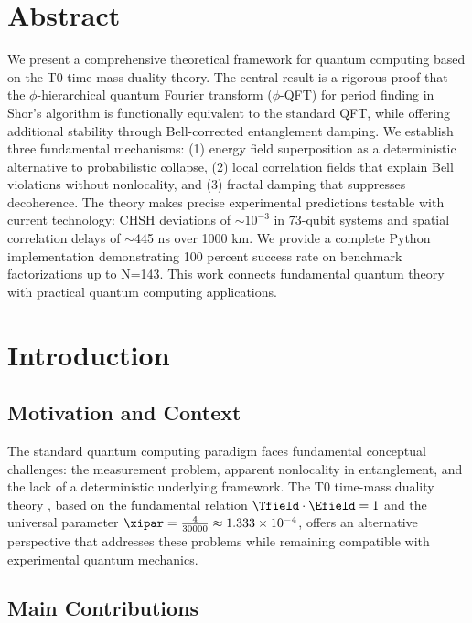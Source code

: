 \section*{Abstract}
We present a comprehensive theoretical framework for quantum computing based on the T0 time-mass duality theory. The central result is a rigorous proof that the $\phi$-hierarchical quantum Fourier transform ($\phi$-QFT) for period finding in Shor's algorithm is functionally equivalent to the standard QFT, while offering additional stability through Bell-corrected entanglement damping. We establish three fundamental mechanisms: (1) energy field superposition as a deterministic alternative to probabilistic collapse, (2) local correlation fields that explain Bell violations without nonlocality, and (3) fractal damping that suppresses decoherence. The theory makes precise experimental predictions testable with current technology: CHSH deviations of $\sim 10^{-3}$ in 73-qubit systems and spatial correlation delays of $\sim$445 ns over 1000 km. We provide a complete Python implementation demonstrating 100 percent success rate on benchmark factorizations up to N=143. This work connects fundamental quantum theory with practical quantum computing applications.


\clearpage

\section{Introduction}

\subsection{Motivation and Context}

The standard quantum computing paradigm faces fundamental conceptual challenges: the measurement problem, apparent nonlocality in entanglement, and the lack of a deterministic underlying framework. The T0 time-mass duality theory \cite{pascher_t0_2025}, based on the fundamental relation $\Tfield \cdot \Efield = 1$ and the universal parameter $\xipar = \frac{4}{30000} \approx 1.333 \times 10^{-4}$, offers an alternative perspective that addresses these problems while remaining compatible with experimental quantum mechanics.

\subsection{Main Contributions}

